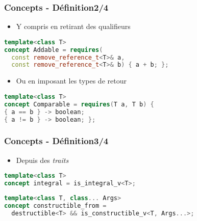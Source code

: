 \documentclass[C++.tex]{subfiles}
\begin{document}
\begin{frame}[fragile]
	\frametitle{Concepts - Définition\titlehfill{}2/4}
	\begin{itemize}
		\item Y compris en retirant des qualifieurs
	\end{itemize}

	\begin{lstlisting}[language=C++]
template<class T>
concept Addable = requires(
  const remove_reference_t<T>& a,
  const remove_reference_t<T>& b) { a + b; };\end{lstlisting}

	\begin{itemize}
		\item Ou en imposant les types de retour
	\end{itemize}

	\begin{lstlisting}[language=C++]
template<class T>
concept Comparable = requires(T a, T b) {
{ a == b } -> boolean;
{ a != b } -> boolean; };\end{lstlisting}
\end{frame}

\begin{frame}[fragile]
	\frametitle{Concepts - Définition\titlehfill{}3/4}
	\begin{itemize}
		\item Depuis des \textit{traits}
	\end{itemize}

	\begin{lstlisting}[language=C++]
template<class T>
concept integral = is_integral_v<T>;\end{lstlisting}

	\begin{lstlisting}[language=C++]
template<class T, class... Args>
concept constructible_from = 
  destructible<T> && is_constructible_v<T, Args...>;\end{lstlisting}
\end{frame}
\end{document}
